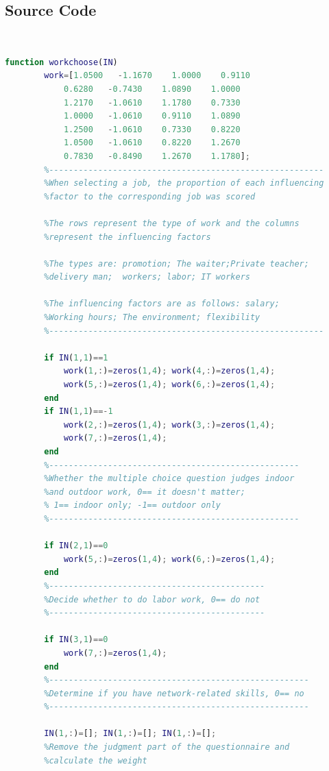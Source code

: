 \documentclass[12pt]{article}
\begin{document}
\begin{appendix}
    \section{Source Code}
    ~~\begin{lstlisting}[language=Matlab]
        function workchoose(IN)
        work=[1.0500   -1.1670    1.0000    0.9110
            0.6280   -0.7430    1.0890    1.0000
            1.2170   -1.0610    1.1780    0.7330
            1.0000   -1.0610    0.9110    1.0890
            1.2500   -1.0610    0.7330    0.8220
            1.0500   -1.0610    0.8220    1.2670
            0.7830   -0.8490    1.2670    1.1780];
        %--------------------------------------------------------
        %When selecting a job, the proportion of each influencing 
        %factor to the corresponding job was scored

        %The rows represent the type of work and the columns 
        %represent the influencing factors

        %The types are: promotion; The waiter;Private teacher; 
        %delivery man;  workers; labor; IT workers

        %The influencing factors are as follows: salary; 
        %Working hours; The environment; flexibility
        %--------------------------------------------------------

        if IN(1,1)==1
            work(1,:)=zeros(1,4); work(4,:)=zeros(1,4);
            work(5,:)=zeros(1,4); work(6,:)=zeros(1,4);
        end
        if IN(1,1)==-1
            work(2,:)=zeros(1,4); work(3,:)=zeros(1,4);
            work(7,:)=zeros(1,4);
        end
        %---------------------------------------------------
        %Whether the multiple choice question judges indoor 
        %and outdoor work, 0== it doesn't matter;
        % 1== indoor only; -1== outdoor only
        %---------------------------------------------------

        if IN(2,1)==0
            work(5,:)=zeros(1,4); work(6,:)=zeros(1,4);
        end
        %--------------------------------------------
        %Decide whether to do labor work, 0== do not
        %--------------------------------------------

        if IN(3,1)==0
            work(7,:)=zeros(1,4);
        end
        %-----------------------------------------------------
        %Determine if you have network-related skills, 0== no
        %-----------------------------------------------------

        IN(1,:)=[]; IN(1,:)=[]; IN(1,:)=[];
        %Remove the judgment part of the questionnaire and 
        %calculate the weight


\end{lstlisting}
\end{appendix}
\end{document}
